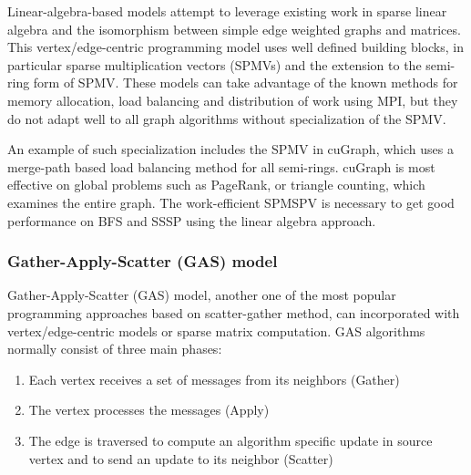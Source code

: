 Linear-algebra-based models attempt to leverage existing work in sparse linear algebra and the isomorphism between simple edge weighted graphs and matrices. This vertex/edge-centric programming model uses well defined building blocks, in particular sparse multiplication vectors (SPMVs) and the extension to the semi-ring form of SPMV. These models can take advantage of the known methods for memory allocation, load balancing and distribution of work using MPI, but they do not adapt well to all graph algorithms without specialization of the SPMV. 

An example of such specialization includes the SPMV in cuGraph, which uses a merge-path based load balancing method for all semi-rings. cuGraph is most effective on global problems such as PageRank, or triangle counting, which examines the entire graph. The work-efficient SPMSPV is necessary to get good performance on BFS and SSSP using the linear algebra approach.  

\subsubsection{Gather-Apply-Scatter (GAS) model}
Gather-Apply-Scatter (GAS) model, another one of the most popular programming approaches based on scatter-gather method, can incorporated with vertex/edge-centric models or sparse matrix computation. GAS algorithms normally consist of three main phases:
\begin{enumerate}
\item Each vertex receives a set of messages from its neighbors (Gather)
\item The vertex processes the messages (Apply)
\item The edge is traversed to compute an algorithm specific update in source vertex and to send an update to its neighbor (Scatter)
\end{enumerate}

